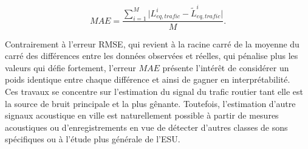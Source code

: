 \begin{equation}
MAE = \frac{\sum_{i = 1}^{M} \vert L_{eq, trafic}^i - \tilde{L}_{eq, trafic}^i \vert}{M}.
\end{equation}

Contrairement à l'erreur RMSE, qui revient à la racine carré de la moyenne du carré des différences entre les données observées et réelles, qui pénalise plus les valeurs qui défie fortement, l'erreur $MAE$ présente l'intérêt de considérer un poids identique entre chaque différence et ainsi de gagner en interprétabilité.\\

Ces travaux se concentre sur l'estimation du signal du trafic routier tant elle est la source de bruit principale et la plus gênante. Toutefois, l'estimation d'autre signaux acoustique en ville est naturellement possible à partir de mesures acoustiques ou d'enregistrements en vue de détecter d'autres classes de sons spécifiques ou à l'étude plus générale de l'ESU.




